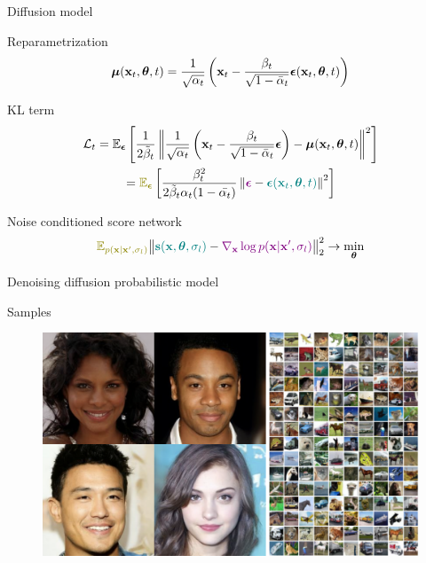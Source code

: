 \begin{frame}{Diffusion model}
	\begin{block}{Reparametrization}
		\vspace{-0.3cm}
		\[
			\boldsymbol{\mu}(\mathbf{x}_t, \boldsymbol{\theta}, t) = \frac{1}{\sqrt{\alpha_t}}\left( \mathbf{x}_t - \frac{\beta_t}{\sqrt{1 - \bar{\alpha}_t} } \boldsymbol{\epsilon}(\mathbf{x}_t, \boldsymbol{\theta}, t) \right) 
		\]
		\vspace{-0.5cm}
	\end{block}
	\begin{block}{KL term}
		\vspace{-0.7cm}
		\begin{multline*}
			\cL_t = \bbE_{\bepsilon} \left[ \frac{1}{2\tilde{\beta}_t} \left\|\frac{1}{\sqrt{\alpha_t}}\left( \bx_t - \frac{\beta_t}{\sqrt{1 - \bar{\alpha}_t} } \bepsilon \right) - \bmu(\bx_t, \btheta, t) \right\|^2 \right] \\ 
			= {\color{olive}\bbE_{\bepsilon}} \left[ \frac{\beta_t^2}{2\tilde{\beta}_t \alpha_t (1 - \bar{\alpha_t})} \left\| {\color{violet}\bepsilon} - {\color{teal}\bepsilon(\bx_t, \btheta, t)}\right\|^2 \right]
		\end{multline*}
		\vspace{-0.5cm}
	\end{block}
	\begin{block}{Noise conditioned score network}
		\vspace{-0.2cm}
		\[
			{\color{olive}\bbE_{p(\bx | \bx', \sigma_l)}}\bigl\| {\color{teal}\bs(\bx, \btheta, \sigma_l)} - {\color{violet}\nabla_\bx \log p(\bx | \bx', \sigma_l)} \bigr\|^2_2 \rightarrow \min_{\btheta}
		\]
	\end{block}
	\end{frame}
\begin{frame}{Denoising diffusion probabilistic model}
	\begin{block}{Samples}
		\begin{figure}
			\includegraphics[width=\linewidth]{figs/ddpm_samples}
		\end{figure}
	\end{block}
\end{frame}
